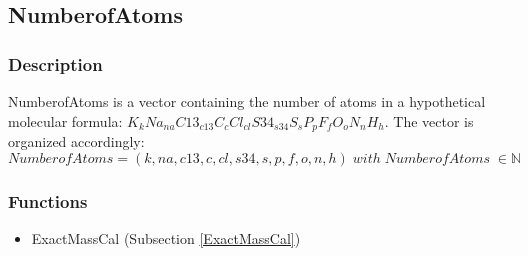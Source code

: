 \subsection{NumberofAtoms}\label{NumberofAtoms}
\subsubsection{Description}

NumberofAtoms is a vector containing the number of atoms in a hypothetical molecular formula: $ K_{k} Na_{na} C13_{c13} C_{c} Cl_{cl} S34_{s34} S_{s} P_{p} F_{f} O_{o} N_{n} H_{h} $. The vector is organized accordingly: 
\begin{equation}
NumberofAtoms=(k,na,c13,c,cl,s34,s,p,f,o,n,h) \; with \; NumberofAtoms \;\in \mathbb{N}
\end{equation}
\subsubsection{Functions}
\begin{itemize}
\item ExactMassCal (Subsection \ref{ExactMassCal})
\end{itemize}

